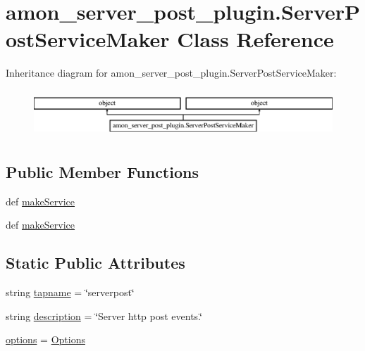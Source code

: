 \hypertarget{classamon__server__post__plugin_1_1_server_post_service_maker}{\section{amon\-\_\-server\-\_\-post\-\_\-plugin.\-Server\-Post\-Service\-Maker Class Reference}
\label{classamon__server__post__plugin_1_1_server_post_service_maker}
}
Inheritance diagram for amon\-\_\-server\-\_\-post\-\_\-plugin.\-Server\-Post\-Service\-Maker\-:\begin{figure}[H]
\begin{center}
\leavevmode
\includegraphics[height=1.794872cm]{classamon__server__post__plugin_1_1_server_post_service_maker}
\end{center}
\end{figure}
\subsection*{Public Member Functions}
\begin{DoxyCompactItemize}
\item 
def \hyperlink{classamon__server__post__plugin_1_1_server_post_service_maker_a9bffb1ce4114dd92a33d835f652170b8}{make\-Service}
\item 
def \hyperlink{classamon__server__post__plugin_1_1_server_post_service_maker_a9bffb1ce4114dd92a33d835f652170b8}{make\-Service}
\end{DoxyCompactItemize}
\subsection*{Static Public Attributes}
\begin{DoxyCompactItemize}
\item 
string \hyperlink{classamon__server__post__plugin_1_1_server_post_service_maker_a4d99413d155a4fd18efe012c18550314}{tapname} = \char`\"{}serverpost\char`\"{}
\item 
string \hyperlink{classamon__server__post__plugin_1_1_server_post_service_maker_a05bfe6bb700fdc34664821194f6fec3b}{description} = \char`\"{}Server http post events.\char`\"{}
\item 
\hyperlink{classamon__server__post__plugin_1_1_server_post_service_maker_aa21d745291714b83201f517a73e6c0ef}{options} = \hyperlink{classamon__server__post__plugin_1_1_options}{Options}
\end{DoxyCompactItemize}


